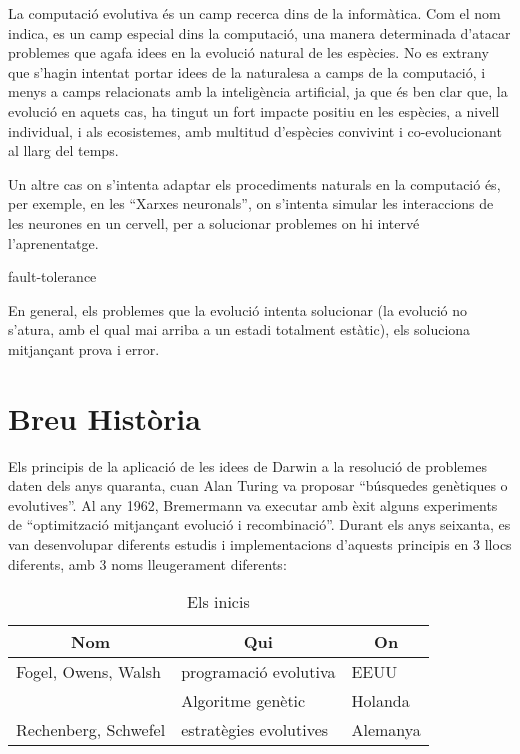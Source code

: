 \documentclass[a4paper]{article}
\begin{document}
La computació evolutiva és un camp recerca dins de la informàtica.  Com el nom
indica, es un camp especial dins la computació, una manera determinada d'atacar
problemes que agafa idees en la evolució natural de les espècies.  No es extrany
que s'hagin intentat portar idees de la naturalesa a camps de la computació, i
menys a camps relacionats amb la inteligència artificial, ja que és ben clar
que, la evolució en aquets cas, ha tingut un fort impacte positiu en les
espècies, a nivell individual, i als ecosistemes, amb multitud d'espècies
convivint i co-evolucionant al llarg del temps.

Un altre cas on s'intenta adaptar els procediments naturals en la computació és,
per exemple, en les ``Xarxes neuronals'', on s'intenta simular les interaccions
de les neurones en un cervell, per a solucionar problemes on hi intervé
l'aprenentatge.

fault-tolerance

En general, els problemes que la evolució intenta solucionar (la evolució no
s'atura, amb el qual mai arriba a un estadi totalment estàtic), els soluciona
mitjançant prova i error.


\section{Breu Història} %
\label{sec:Breu Historia}

Els principis de la aplicació de les idees de Darwin a la resolució de problemes
daten dels anys quaranta, cuan Alan Turing va proposar ``búsquedes genètiques o
evolutives''.  Al any 1962, Bremermann va executar amb èxit alguns experiments
de ``optimització mitjançant evolució i recombinació''.  Durant els anys
seixanta, es van desenvolupar diferents estudis i implementacions d'aquests
principis en 3 llocs diferents, amb 3 noms lleugerament diferents:



\begin{table}
\centering
\caption{Els inicis}
\begin{tabular}{|l|l|l|}
\hline
\multicolumn{1}{|c|}{\textbf{Nom }} & \multicolumn{1}{c|}{\textbf{ Qui }} & \multicolumn{1}{c|}{\textbf{ On}} \\
\hline
\hline
Fogel, Owens, Walsh  & programació evolutiva  & EEUU     \\
                     & Algoritme genètic      & Holanda  \\
Rechenberg, Schwefel & estratègies evolutives & Alemanya \\
\hline
\end{tabular}
\end{table}
\end{document}
